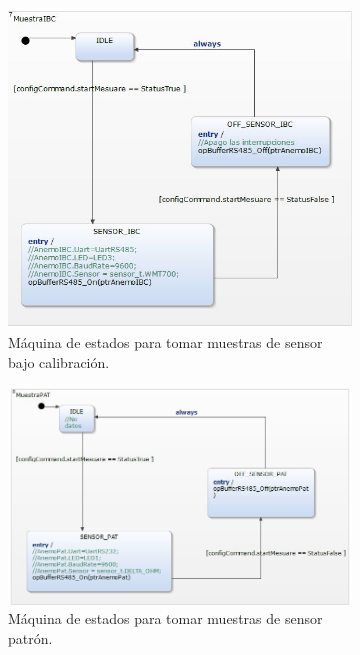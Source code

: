 \begin{figure}[H]
    \centering
    \begin{subfigure}[b]{0.45\textwidth}
        \centering
        \includegraphics[width=1.2\linewidth]{Figuras/datalogger/Firmware/MuestraIBC.jpg}
        \caption{Máquina de estados para tomar muestras de sensor bajo calibración.}
        \label{fig:MuestraIBC}
    \end{subfigure}\hspace{0.09\textwidth}
    \begin{subfigure}[b]{0.45\textwidth}
        \centering
        \includegraphics[width=1.2\linewidth]{Figuras/datalogger/Firmware/MuestraPAT.jpg}
        \caption{Máquina de estados para tomar muestras de sensor patrón.}
        \label{fig:MuestraPAT}
    \end{subfigure}
    \caption{}
    \label{fig:mainFigure}
\end{figure}

